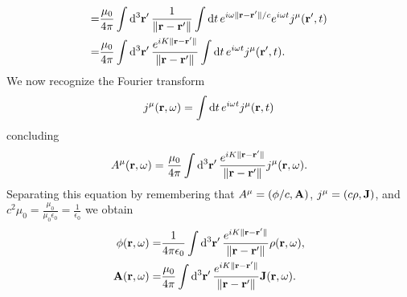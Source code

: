 \documentclass{article}
\begin{document}
\begin{enumerate}[(i)]
\begin{align}
\begin{split}
=&\frac{\mu_0}{4\pi}\int \dd[3]{\vb{r}'}\frac{1}{\|\vb{r}-\vb{r}'\|}\int\dd{t}e^{i\omega\|\vb{r}-\vb{r}'\|/c}e^{i\omega t}j^\mu(\vb{r}',t)\\
=&\frac{\mu_0}{4\pi}\int \dd[3]{\vb{r}'}\frac{e^{iK\|\vb{r}-\vb{r}'\|}}{\|\vb{r}-\vb{r}'\|}\int\dd{t}e^{i\omega t}j^\mu(\vb{r}',t).
\end{split}
\end{align}
We now recognize the Fourier transform
\begin{equation}\label{ec:fourier_current}
j^\mu(\vb{r},\omega)=\int\dd{t}e^{i\omega t}j^\mu(\vb{r},t)
\end{equation}
concluding
\begin{equation}
A^\mu(\vb{r},\omega)=\frac{\mu_0}{4\pi}\int \dd[3]{\vb{r}'}\frac{e^{iK\|\vb{r}-\vb{r}'\|}}{\|\vb{r}-\vb{r}'\|}j^\mu(\vb{r},\omega).
\end{equation}
Separating this equation by remembering that $A^\mu=(\phi/c,\vb{A})$, $j^\mu=(c\rho,\vb{J})$, and $c^2\mu_0=\frac{\mu_0}{\mu_0\epsilon_0}=\frac{1}{\epsilon_0}$ we obtain
\begin{align}
\begin{split}
\phi(\vb{r},\omega)=&\frac{1}{4\pi\epsilon_0}\int \dd[3]{\vb{r}'}\frac{e^{iK\|\vb{r}-\vb{r}'\|}}{\|\vb{r}-\vb{r}'\|}\rho(\vb{r},\omega),\\
\vb{A}(\vb{r},\omega)=&\frac{\mu_0}{4\pi}\int \dd[3]{\vb{r}'}\frac{e^{iK\|\vb{r}-\vb{r}'\|}}{\|\vb{r}-\vb{r}'\|}\vb{J}(\vb{r},\omega).
\end{split}
\end{align}


\end{enumerate}
\end{document}
